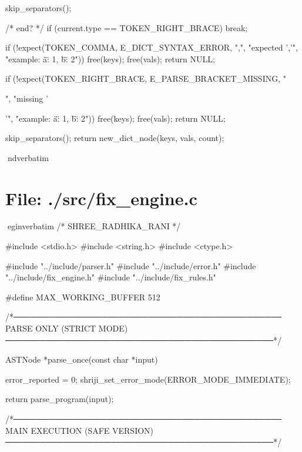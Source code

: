 \documentclass{article}
\begin{document}
{{{{{skip_separators();






/* end? */
if (current.type == TOKEN_RIGHT_BRACE)
    break;

if (!expect(TOKEN_COMMA, E_DICT_SYNTAX_ERROR, ",", "expected ','",
            "example: {\"a\": 1, \"b\": 2}")) {
    free(keys);
    free(vals);
    return NULL;
}

        }
    }

    if (!expect(TOKEN_RIGHT_BRACE, E_PARSE_BRACKET_MISSING, "}", "missing '}'",
                "example: {\"a\": 1, \"b\": 2}")) {
        free(keys);
        free(vals);
        return NULL;
    }

    skip_separators();
    return new_dict_node(keys, vals, count);
}

nd{verbatim}
\section*{File: ./src/fix_engine.c}
egin{verbatim}
/* SHREE_RADHIKA_RANI */

#include <stdio.h>
#include <string.h>
#include <ctype.h>

#include "../include/parser.h"
#include "../include/error.h"
#include "../include/fix_engine.h"
#include "../include/fix_rules.h"

#define MAX_WORKING_BUFFER 512


/*──────────────────────────────────────────────
   PARSE ONLY (STRICT MODE)
──────────────────────────────────────────────*/

ASTNode *parse_once(const char *input)
{
    error_reported = 0;
    shriji_set_error_mode(ERROR_MODE_IMMEDIATE);

    return parse_program(input);
}


/*──────────────────────────────────────────────
   MAIN EXECUTION (SAFE VERSION)
──────────────────────────────────────────────*/
\end{document}
